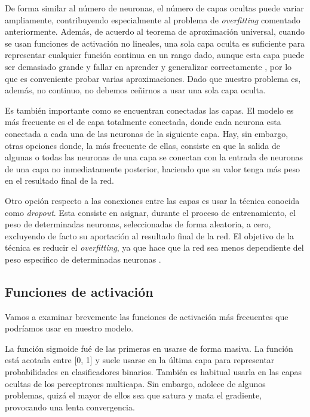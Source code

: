 De forma similar al número de neuronas, el número de capas ocultas puede
variar ampliamente, contribuyendo especialmente al problema de
\emph{overfitting} comentado anteriormente. Además, de acuerdo al
teorema de aproximación universal, cuando se usan funciones de
activación no lineales, una sola capa oculta es suficiente para
representar cualquier función continua en un rango dado, aunque esta
capa puede ser demasiado grande y fallar en aprender y generalizar
correctamente \cite{Goodfellow-et-al-2016}, por lo que es conveniente probar varias
aproximaciones. Dado que nuestro problema es, además, no continuo, no
debemos ceñirnos a usar una sola capa oculta.

Es también importante como se encuentran conectadas las capas. El modelo
es más frecuente es el de capa totalmente conectada, donde cada neurona
esta conectada a cada una de las neuronas de la siguiente capa. Hay, sin
embargo, otras opciones donde, la más frecuente de ellas, consiste en
que la salida de algunas o todas las neuronas de una capa se conectan
con la entrada de neuronas de una capa no inmediatamente posterior,
haciendo que su valor tenga más peso en el resultado final de la red.

Otro opción respecto a las conexiones entre las capas es usar la técnica
conocida como \emph{dropout}. Esta consiste en asignar, durante el
proceso de entrenamiento, el peso de determinadas neuronas,
seleccionadas de forma aleatoria, a cero, excluyendo de facto su
aportación al resultado final de la red. El objetivo de la técnica es
reducir el \emph{overfitting}, ya que hace que la red sea menos
dependiente del peso especifico de determinadas neuronas \cite{JMLR:v15:srivastava14a}.

\subsection{Funciones de activación}\label{funciones-de-activacion}

Vamos a examinar brevemente las funciones de activación más frecuentes
que podríamos usar en nuestro modelo.

La función sigmoide fué de las primeras en usarse de forma masiva. La
función está acotada entre {[}0, 1{]} y suele usarse en la última capa
para representar probabilidades en clasificadores binarios. También es
habitual usarla en las capas ocultas de los perceptrones multicapa. Sin
embargo, adolece de algunos problemas, quizá el mayor de ellos sea que
satura y mata el gradiente, provocando una lenta convergencia.

